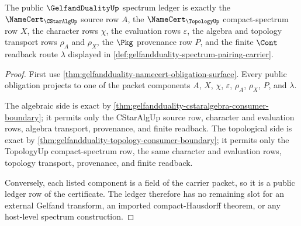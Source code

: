 \begin{theorem}
\label{thm:gelfandduality-spectrum-ledger-exactness}
The public $\GelfandDualityUp$ spectrum ledger is exactly the
$\NameCert_{\CStarAlgUp}$ source row $A$, the $\NameCert_{\TopologyUp}$
compact-spectrum row $X$, the character rows $\chi$, the evaluation rows
$\varepsilon$, the algebra and topology transport rows $\rho_{A}$ and
$\rho_{X}$, the $\Pkg$ provenance row $P$, and the finite $\Cont$ readback route
$\lambda$ displayed in \autoref{def:gelfandduality-spectrum-pairing-carrier}.
\end{theorem}
\begin{proof}
First use \autoref{thm:gelfandduality-namecert-obligation-surface}. Every
public obligation projects to one of the packet components $A$, $X$, $\chi$,
$\varepsilon$, $\rho_{A}$, $\rho_{X}$, $P$, and $\lambda$.

The algebraic side is exact by
\autoref{thm:gelfandduality-cstaralgebra-consumer-boundary}; it permits only the
CStarAlgUp source row, character and evaluation rows, algebra transport,
provenance, and finite readback. The topological side is exact by
\autoref{thm:gelfandduality-topology-consumer-boundary}; it permits only the
TopologyUp compact-spectrum row, the same character and evaluation rows,
topology transport, provenance, and finite readback.

Conversely, each listed component is a field of the carrier packet, so it is a
public ledger row of the certificate. The ledger therefore has no remaining
slot for an external Gelfand transform, an imported compact-Hausdorff theorem,
or any host-level spectrum construction.
\end{proof}

